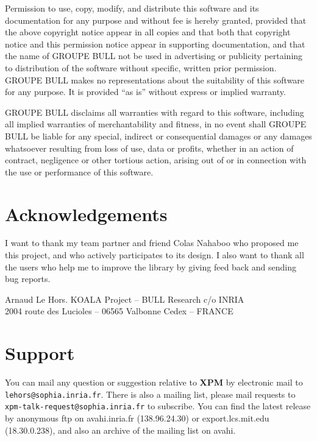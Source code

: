 {\sf
Permission to use, copy, modify, and distribute this software and its
documentation for any purpose and without fee is hereby granted, provided
that the above copyright notice appear in all copies and that both that
copyright notice and this permission notice appear in supporting
documentation, and that the name of GROUPE BULL not be used in advertising
or publicity pertaining to distribution of the software without specific,
written prior permission.  GROUPE BULL makes no representations about the
suitability of this software for any purpose.  It is provided ``as is''
without express or implied warranty.

GROUPE BULL disclaims all warranties with regard to this software,
including all implied warranties of merchantability and fitness,
in no event shall GROUPE BULL be liable for any special,
indirect or consequential damages or any damages
whatsoever resulting from loss of use, data or profits,
whether in an action of contract, negligence or other tortious
action, arising out of or in connection with the use 
or performance of this software.
}

\section*{Acknowledgements}

I want to thank my team partner and friend Colas Nahaboo who proposed me this
project, and who actively participates to its design. I also want to thank all
the users who help me to improve the library by giving feed back and sending
bug reports.

\begin{flushright}
{\Large Arnaud Le Hors.\quad}
{\small
KOALA Project -- BULL Research c/o INRIA\\
2004 route des Lucioles -- 06565 Valbonne Cedex -- FRANCE\\
}
\end{flushright}

\section*{Support}

\sloppy 
You can mail any question or suggestion relative to {\bf XPM} by electronic
mail to {\tt lehors@sophia.inria.fr}. There is also a mailing list, please
mail requests to {\tt xpm-talk-request@sophia.inria.fr} to subscribe.  You can
find the latest release by anonymous ftp on avahi.inria.fr (138.96.24.30) or
export.lcs.mit.edu (18.30.0.238), and also an archive of the mailing list on
avahi.


